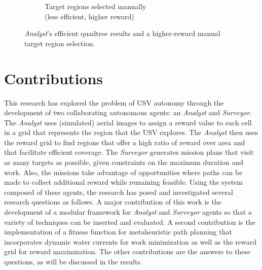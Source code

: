 \documentclass{tamuccthesis}
\begin{document}
\begin{figure}[H]
\begin{subfigure}[b]{0.475\textwidth}
        \caption{Target regions selected manually \\ (less efficient, higher reward)}   
        \label{fig:quadtree_b}
    \end{subfigure}
    \caption[Quadtree algorithm: efficient but sub-optimal.]{\textit{Analyst}'s efficient quadtree results and a higher-reward manual target region selection.}
    \label{fig:quadtree_compare}
\end{figure}

\section{Contributions}
\label{section:contributions}

This research has explored the problem of USV autonomy through the development of two collaborating autonomous agents: an \textit{Analyst} and \textit{Surveyor}. The \textit{Analyst} uses (simulated) aerial images to assign a reward value to each cell in a grid that represents the region that the USV explores. The \textit{Analyst} then uses the reward grid to find regions that offer a high ratio of reward over area and that facilitate efficient coverage. The \textit{Surveyor} generates mission plans that visit as many targets as possible, given constraints on the maximum duration and work. Also, the missions take advantage of opportunities where paths can be made to collect additional reward while remaining feasible. Using the system composed of these agents, the research has posed and investigated several research questions as follows. A major contribution of this work is the development of a modular framework for \textit{Analyst} and \textit{Surveyor} agents so that a variety of techniques can be inserted and evaluated. A second contribution is the implementation of a fitness function for metaheuristic path planning that incorporates dynamic water currents for work minimization as well as the reward grid for reward maximization. The other contributions are the answers to these questions, as will be discussed in the results.
\end{document}
